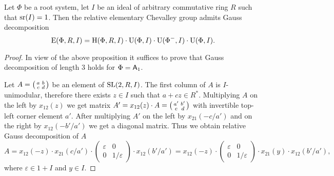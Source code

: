 \begin{thm}\label{thm:srRI1}
Let $\Phi$ be a root system, let $I$ be an ideal of arbitrary commutative ring $R$ such that $\operatorname{sr}(I)=1$.
Then the relative elementary Chevalley group admits Gauss decomposition
\[ \operatorname{E}(\Phi,R,I) = \operatorname{H}(\Phi,R,I) \cdot \operatorname{U}(\Phi,I) \cdot \operatorname{U}(\Phi^-,I) \cdot \operatorname{U}(\Phi,I). \]
\end{thm}
\begin{proof}
In view of the above proposition it suffices to prove that Gauss decomposition of length $3$ holds for $\Phi=\mathsf{A}_1$.

Let $A=\begin{psmallmatrix}a & b \\ c & d\end{psmallmatrix}$ be an element of $\operatorname{SL}(2, R, I)$.
The first column of $A$ is $I$-unimodular, therefore there exists $z\in I$ such that $a+cz\in R^*$.
Multiplying $A$ on the left by $x_{12}(z)$ we get matrix $A'=x_{12}(z)\cdot A=\begin{psmallmatrix}a' & b' \\ c & d\end{psmallmatrix}$ with invertible top-left corner element $a'$.
After multiplying $A'$ on the left by $x_{21}(-c/a')$ and on the right by $x_{12}(-b'/a')$ we get a diagonal matrix. 
Thus we obtain relative Gauss decomposition of $A$
\begin{equation}\nonumber
A=x_{12}(-z)\cdot x_{21}(c/a')\cdot
\begin{pmatrix} \varepsilon & 0 \\ 0 & 1/\varepsilon \end{pmatrix}
\cdot x_{12}(b'/a')=x_{12}(-z)\cdot
\begin{pmatrix} \varepsilon & 0 \\ 0 & 1/\varepsilon \end{pmatrix}
\cdot x_{21}(y) \cdot x_{12}(b'/a'),
\end{equation}
where $\varepsilon\in 1+I$ and $y\in I$. \end{proof}